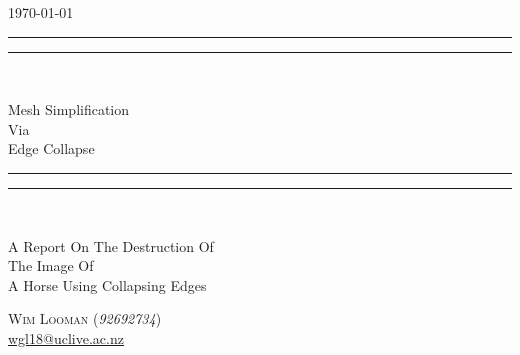 \begin{titlepage}
\centering
\vspace*{\baselineskip}

\flushright\today\\
\centering
\rule{\textwidth}{1.6pt}\vspace*{-\baselineskip}\vspace*{2pt}
\rule{\textwidth}{0.4pt}\\[\baselineskip]

{\Huge \scshape

  Mesh Simplification\\
  Via\\
  Edge Collapse

}

\rule{\textwidth}{0.4pt}\vspace*{-\baselineskip}\vspace*{3.2pt}
\rule{\textwidth}{1.6pt}\\[\baselineskip]
{\scshape \large

  A Report On The Destruction Of\\
  The Image Of\\
  A Horse Using Collapsing Edges

}


\vspace*{3\baselineskip}
{\Large

  {\scshape Wim Looman} (\emph{92692734})\\
  \url{wgl18@uclive.ac.nz}\\
}

\end{titlepage}
